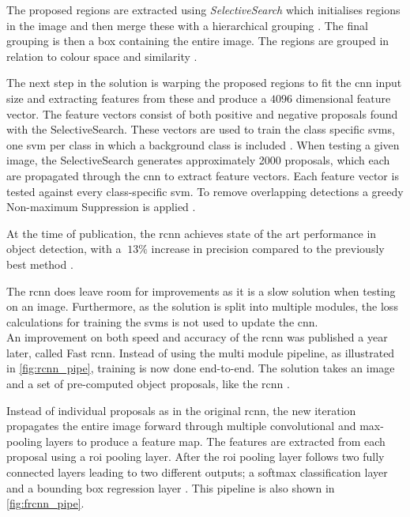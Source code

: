 The proposed regions are extracted using \textit{SelectiveSearch} which initialises regions in the image and then merge these with a hierarchical grouping \citep{Uijlings2013}. The final grouping is then a box containing the entire image. The regions are grouped in relation to colour space and similarity \citep{Girshick2014}. 

The next step in the solution is warping the proposed regions to fit the \gls{cnn} input size and extracting features from these and produce a $4096$ dimensional feature vector. The feature vectors consist of both positive and negative proposals found with the SelectiveSearch. These vectors are used to train the class specific \gls{svm}s, one \gls{svm} per class in which a background class is included \citep{Girshick2014}.
When testing a given image, the SelectiveSearch generates approximately 2000 proposals, which each are propagated through the \gls{cnn} to extract feature vectors. Each feature vector is tested against every class-specific \gls{svm}. To remove overlapping detections a greedy Non-maximum Suppression is applied \citep{Girshick2014}.

At the time of publication, the \gls{rcnn} achieves state of the art performance in object detection, with a $~13\%$ increase in precision compared to the previously best method \citep{Girshick2014}.

The \gls{rcnn} does leave room for improvements as it is a slow solution when testing on an image. Furthermore, as the solution is split into multiple modules, the loss calculations for training the \gls{svm}s is not used to update the \gls{cnn}.\\

An improvement on both speed and accuracy of the \gls{rcnn} was published a year later, called Fast \gls{rcnn}. Instead of using the multi module pipeline, as illustrated in \autoref{fig:rcnn_pipe}, training is now done end-to-end. The solution takes an image  and a set of pre-computed object proposals, like the \gls{rcnn} \citep{Girshick2015}.

Instead of individual proposals as in the original \gls{rcnn}, the new iteration propagates the entire image forward through multiple convolutional and max-pooling layers to produce a feature map. The features are extracted from each proposal using a \gls{roi} pooling layer. After the \gls{roi} pooling layer follows two fully connected layers leading to two different outputs; a softmax classification layer and a bounding box regression layer \citep{Girshick2015}. This pipeline is also shown in \autoref{fig:frcnn_pipe}.


